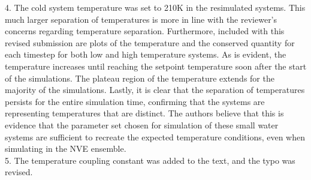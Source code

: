 \documentclass{article}
\begin{document}

4. The cold system temperature was set to 210K in the resimulated systems. This much larger separation of temperatures is more in line with the reviewer's concerns regarding temperature separation. Furthermore, included with this revised submission are plots of the temperature and the conserved quantity for each timestep for both low and high temperature systems. As is evident, the temperature increases until reaching the setpoint temperature soon after the start of the simulations. The plateau region of the temperature extends for the majority of the simulations. Lastly, it is clear that the separation of temperatures persists for the entire simulation time, confirming that the systems are representing temperatures that are distinct. The authors believe that this is evidence that the parameter set chosen for simulation of these small water systems are sufficient to recreate the expected temperature conditions, even when simulating in the NVE ensemble.
\\

5. The temperature coupling constant was added to the text, and the typo was revised.
\\
\end{document}
